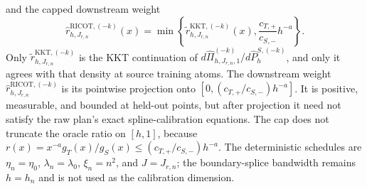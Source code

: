 and the capped downstream weight
\[
\widehat r^{\mathrm{RICOT},(-k)}_{h,J_{r,n}}(x)=\min\left\{\widetilde r^{\mathrm{KKT},(-k)}_{h,J_{r,n}}(x),\frac{c_{T,+}}{c_{S,-}}h^{-a}\right\}.
\]
Only \(\widetilde r^{\mathrm{KKT},(-k)}_{h,J_{r,n}}\) is the KKT continuation of \(d\widehat\Pi^{(-k)}_{h,J_{r,n},1}/d\widehat P^{S,(-k)}_h\), and only it agrees with that density at source training atoms. The downstream weight \(\widehat r^{\mathrm{RICOT},(-k)}_{h,J_{r,n}}\) is its pointwise projection onto \([0,(c_{T,+}/c_{S,-})h^{-a}]\). It is positive, measurable, and bounded at held-out points, but after projection it need not satisfy the raw plan's exact spline-calibration equations. The cap does not truncate the oracle ratio on \([h,1]\), because \(r(x)=x^{-a}g_T(x)/g_S(x)\le(c_{T,+}/c_{S,-})h^{-a}\). The deterministic schedules are \(\eta_n=\eta_0\), \(\lambda_n=\lambda_0\), \(\xi_n=n^2\), and \(J=J_{r,n}\); the boundary-splice bandwidth remains \(h=h_n\) and is not used as the calibration dimension.